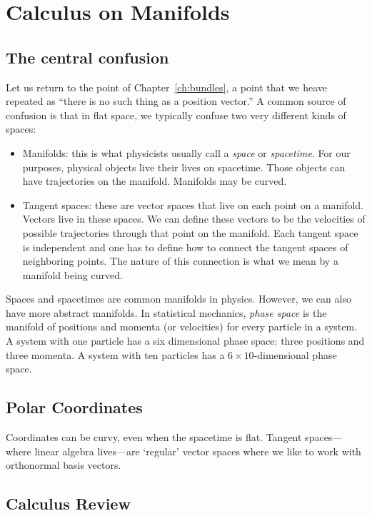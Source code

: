 \chapter{Calculus on Manifolds}


\section{The central confusion}

Let us return to the point of Chapter~\ref{ch:bundles}, a point that we heave repeated as ``there is no such thing as a position vector.'' A common source of confusion is that in flat space, we typically confuse two very different kinds of spaces:
\begin{itemize}
	\item Manifolds: this is what physicists usually call a \emph{space} or \emph{spacetime}. For our purposes, physical objects live their lives on spacetime. Those objects can have trajectories on the manifold. Manifolds may be curved.
	\item Tangent spaces: these are vector spaces that live on each point on a manifold. Vectors live in these spaces. We can define these vectors to be the velocities of possible trajectories through that point on the manifold. Each tangent space is independent and one has to define how to connect the tangent spaces of neighboring points. The nature of this connection is what we mean by a manifold being curved.
\end{itemize}
\begin{example}
Spaces and spacetimes are common manifolds in physics. However, we can also have more abstract manifolds. In statistical mechanics, \emph{phase space} is the manifold of positions and momenta (or velocities) for every particle in a system. A system with one particle has a six dimensional phase space: three positions and three momenta. A system with ten particles has a $6\times 10$-dimensional phase space. 
\end{example}


\section{Polar Coordinates}

Coordinates can be curvy, even when the spacetime is flat. Tangent spaces---where linear algebra lives---are `regular' vector spaces where we like to work with orthonormal basis vectors.

\section{Calculus Review}